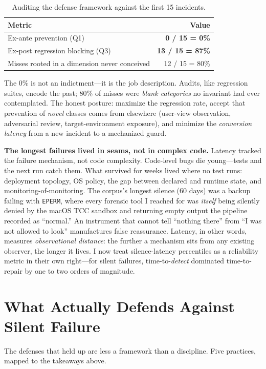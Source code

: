 \documentclass[10pt,journal]{IEEEtran}
\begin{document}
\begin{table}[t]
\centering
\caption{Auditing the defense framework against the first 15 incidents.}
\label{tab:audit}
\begin{tabular}{@{}p{6.0cm}r@{}}
\toprule
\textbf{Metric} & \textbf{Value} \\
\midrule
Ex-ante prevention (Q1) & \textbf{0 / 15 = 0\%} \\
Ex-post regression blocking (Q3) & \textbf{13 / 15 = 87\%} \\
Misses rooted in a dimension never conceived & 12 / 15 = 80\% \\
\bottomrule
\end{tabular}
\end{table}

The 0\% is not an indictment---it is the job description. Audits, like
regression suites, encode the past; 80\% of misses were \emph{blank categories}
no invariant had ever contemplated. The honest posture: maximize the regression
rate, accept that prevention of \emph{novel} classes comes from elsewhere
(user-view observation, adversarial review, target-environment exposure), and
minimize the \emph{conversion latency} from a new incident to a mechanized
guard.

\textbf{The longest failures lived in seams, not in complex code.} Latency
tracked the failure mechanism, not code complexity. Code-level bugs die
young---tests and the next run catch them. What survived for weeks lived where
no test runs: deployment topology, OS policy, the gap between declared and
runtime state, and monitoring-of-monitoring. The corpus's longest silence (60
days) was a backup failing with \texttt{EPERM}, where every forensic tool I
reached for was \emph{itself} being silently denied by the macOS TCC sandbox
and returning empty output the pipeline recorded as ``normal.'' An instrument
that cannot tell ``nothing there'' from ``I was not allowed to look''
manufactures false reassurance. Latency, in other words, measures
\emph{observational distance}: the further a mechanism sits from any existing
observer, the longer it lives. I now treat silence-latency percentiles as a
reliability metric in their own right---for silent failures,
time-to-\emph{detect} dominated time-to-repair by one to two orders of
magnitude.

\section{What Actually Defends Against Silent Failure}
The defenses that held up are less a framework than a discipline. Five
practices, mapped to the takeaways above.
\end{document}
